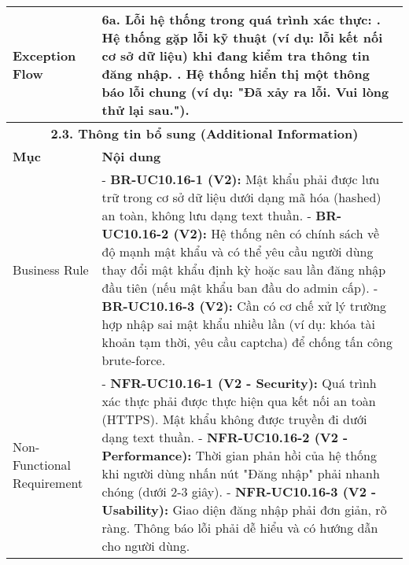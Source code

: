 \begin{longtable}{|m{4cm}|p{11cm}|}
\hline
Exception Flow & \textbf{6a. Lỗi hệ thống trong quá trình xác thực:} \newline    1. Hệ thống gặp lỗi kỹ thuật (ví dụ: lỗi kết nối cơ sở dữ liệu) khi đang kiểm tra thông tin đăng nhập. \newline    2. Hệ thống hiển thị một thông báo lỗi chung (ví dụ: "Đã xảy ra lỗi. Vui lòng thử lại sau."). \\
\hline
\multicolumn{2}{|c|}{\textbf{2.3. Thông tin bổ sung (Additional Information)}} \\
\hline
\textbf{Mục} & \textbf{Nội dung} \\
\hline
Business Rule & - \textbf{BR-UC10.16-1 (V2):} Mật khẩu phải được lưu trữ trong cơ sở dữ liệu dưới dạng mã hóa (hashed) an toàn, không lưu dạng text thuần. \newline - \textbf{BR-UC10.16-2 (V2):} Hệ thống nên có chính sách về độ mạnh mật khẩu và có thể yêu cầu người dùng thay đổi mật khẩu định kỳ hoặc sau lần đăng nhập đầu tiên (nếu mật khẩu ban đầu do admin cấp). \newline - \textbf{BR-UC10.16-3 (V2):} Cần có cơ chế xử lý trường hợp nhập sai mật khẩu nhiều lần (ví dụ: khóa tài khoản tạm thời, yêu cầu captcha) để chống tấn công brute-force. \\
\hline
Non-Functional Requirement & - \textbf{NFR-UC10.16-1 (V2 - Security):} Quá trình xác thực phải được thực hiện qua kết nối an toàn (HTTPS). Mật khẩu không được truyền đi dưới dạng text thuần. \newline - \textbf{NFR-UC10.16-2 (V2 - Performance):} Thời gian phản hồi của hệ thống khi người dùng nhấn nút "Đăng nhập" phải nhanh chóng (dưới 2-3 giây). \newline - \textbf{NFR-UC10.16-3 (V2 - Usability):} Giao diện đăng nhập phải đơn giản, rõ ràng. Thông báo lỗi phải dễ hiểu và có hướng dẫn cho người dùng. \\
\hline
\end{longtable}

